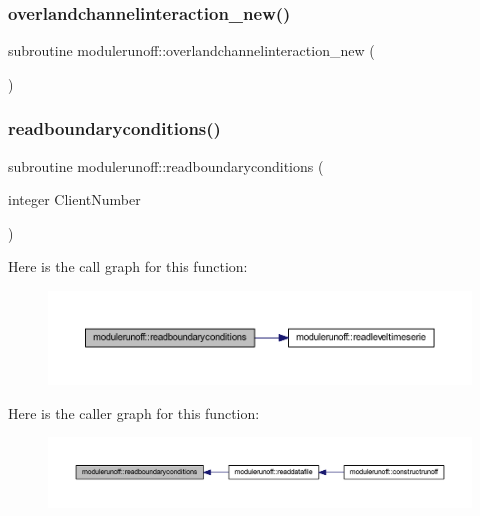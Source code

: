 \subsubsection{\texorpdfstring{overlandchannelinteraction\+\_\+new()}{overlandchannelinteraction\_new()}}
{\footnotesize\ttfamily subroutine modulerunoff\+::overlandchannelinteraction\+\_\+new (\begin{DoxyParamCaption}{ }\end{DoxyParamCaption})\hspace{0.3cm}{\ttfamily [private]}}

\mbox{\label{namespacemodulerunoff_ad906e87c7318e0ecc61ef60d8121f37c}} 
\subsubsection{\texorpdfstring{readboundaryconditions()}{readboundaryconditions()}}
{\footnotesize\ttfamily subroutine modulerunoff\+::readboundaryconditions (\begin{DoxyParamCaption}\item[{integer}]{Client\+Number }\end{DoxyParamCaption})\hspace{0.3cm}{\ttfamily [private]}}

Here is the call graph for this function\+:\nopagebreak
\begin{figure}[H]
\begin{center}
\leavevmode
\includegraphics[width=350pt]{namespacemodulerunoff_ad906e87c7318e0ecc61ef60d8121f37c_cgraph}
\end{center}
\end{figure}
Here is the caller graph for this function\+:\nopagebreak
\begin{figure}[H]
\begin{center}
\leavevmode
\includegraphics[width=350pt]{namespacemodulerunoff_ad906e87c7318e0ecc61ef60d8121f37c_icgraph}
\end{center}
\end{figure}
\mbox{\label{namespacemodulerunoff_a82e45fea3cfee6af75a962d5a7d2224b}} 
